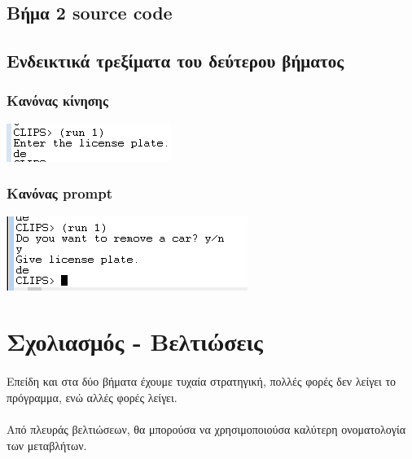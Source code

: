 \documentclass{article}
\begin{document}
    \newpage
    \subsection{Βήμα 2 source code}
    

    \newpage
    \subsection{Ενδεικτικά τρεξίματα του δεύτερου βήματος}
    \subsubsection{Κανόνας κίνησης}
    \includegraphics{images/dialog_window_b2_1.png}

    \subsubsection{Κανόνας prompt}
    \includegraphics{images/dialog_window_b2_2.png}

    \section{Σχολιασμός - Βελτιώσεις}
    \paragraph{}
    Επείδη και στα δύο βήματα έχουμε τυχαία στρατηγική, πολλές φορές δεν λείγει το πρόγραμμα, ενώ αλλές φορές λείγει.

    \paragraph{}
    Από πλευράς βελτιώσεων, θα μπορούσα να χρησιμοποιούσα καλύτερη ονοματολογία των μεταβλήτων.
\end{document}
